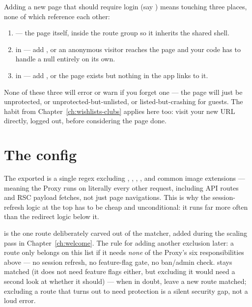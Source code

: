 \begin{olkhowto}
Adding a new page that should require login (say ) means touching three places, none of which reference each other:
\begin{enumerate}
  \item {} — the page itself, inside the  route group so it inherits the shared shell.
  \item {} in  — add , or an anonymous visitor reaches the page and your code has to handle a null  entirely on its own.
  \item {} in  — add , or the page exists but nothing in the app links to it.
\end{enumerate}
None of these three will error or warn if you forget one — the page will just be unprotected, or unprotected-but-unlisted, or listed-but-crashing for guests. The habit from Chapter~\ref{ch:wishlists-clubs} applies here too: visit your new URL directly, logged out, before considering the page done.
\end{olkhowto}

\section{The  config}

The exported  is a single regex excluding , , , , and common image extensions — meaning the Proxy runs on literally every other request, including API routes and RSC payload fetches, not just page navigations. This is why the session-refresh logic at the top has to be cheap and unconditional: it runs far more often than the redirect logic below it.

\begin{olkhowto}
 is the one route deliberately carved out of the matcher, added during the scaling pass in Chapter~\ref{ch:welcome}. The rule for adding another exclusion later: a route only belongs on this list if it needs \emph{none} of the Proxy's six responsibilities above — no session refresh, no feature-flag gate, no ban/admin check.  stays matched (it does not need feature flags either, but excluding it would need a second look at whether it should) — when in doubt, leave a new route matched; excluding a route that turns out to need protection is a silent security gap, not a loud error.
\end{olkhowto}
